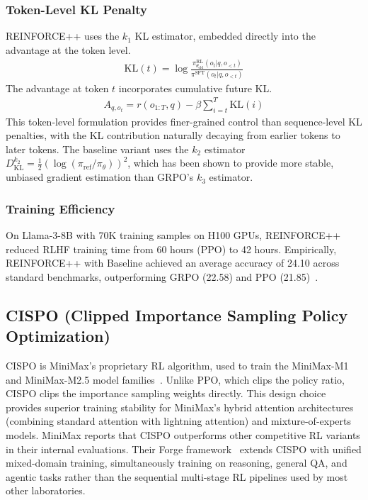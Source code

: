\documentclass[12pt]{article}
\begin{document}
\subsubsection{Token-Level KL Penalty}

REINFORCE++ uses the $k_1$ KL estimator, embedded directly into the advantage at the token level.
\begin{align}
\text{KL}(t) = \log \frac{\pi_{\theta_{\text{old}}}^{\text{RL}}(o_t | q, o_{<t})}{\pi^{\text{SFT}}(o_t | q, o_{<t})}
\end{align}
The advantage at token $t$ incorporates cumulative future KL.
\begin{align}
A_{q, o_t} = r(o_{1:T}, q) - \beta \sum_{i=t}^{T} \text{KL}(i)
\end{align}
This token-level formulation provides finer-grained control than sequence-level KL penalties, with the KL contribution naturally decaying from earlier tokens to later tokens. The baseline variant uses the $k_2$ estimator $D_{\text{KL}}^{k_2} = \frac{1}{2}(\log(\pi_{\text{ref}} / \pi_\theta))^2$, which has been shown to provide more stable, unbiased gradient estimation than GRPO's $k_3$ estimator.

\subsubsection{Training Efficiency}

On Llama-3-8B with 70K training samples on H100 GPUs, REINFORCE++ reduced RLHF training time from 60 hours (PPO) to 42 hours. Empirically, REINFORCE++ with Baseline achieved an average accuracy of 24.10 across standard benchmarks, outperforming GRPO (22.58) and PPO (21.85)~\cite{Hu2025Reinforce}.

\subsection{CISPO (Clipped Importance Sampling Policy Optimization)}

CISPO is MiniMax's proprietary RL algorithm, used to train the MiniMax-M1 and MiniMax-M2.5 model families~\cite{MiniMax2025M1}. Unlike PPO, which clips the policy ratio, CISPO clips the importance sampling weights directly. This design choice provides superior training stability for MiniMax's hybrid attention architectures (combining standard attention with lightning attention) and mixture-of-experts models. MiniMax reports that CISPO outperforms other competitive RL variants in their internal evaluations. Their Forge framework~\cite{MiniMax2025Forge} extends CISPO with unified mixed-domain training, simultaneously training on reasoning, general QA, and agentic tasks rather than the sequential multi-stage RL pipelines used by most other laboratories.
\end{document}
